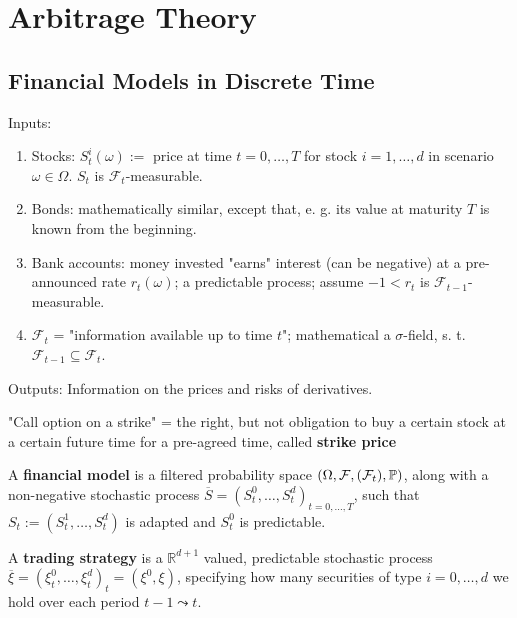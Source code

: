 \chapter{Arbitrage Theory}

\section{Financial Models in Discrete Time}

\begin{defi} 
Inputs:
\begin{enumerate}
    \item Stocks: $S_t^i(\omega) :=$ price at time $t=0, \ldots, T$ for stock $i=1, \ldots, d$ in scenario $\omega\in \Omega$. $S_t$ is $\mathcal F_t$-measurable.
    \item Bonds: mathematically similar, except that, e. g. its value at maturity $T$ is known from the beginning.
    \item Bank accounts: money invested "earns" interest (can be negative) at a pre-announced rate $r_t(\omega)$; a predictable process; assume $-1<r_t$ is $\mathcal F_{t-1}$-measurable.
    \item $\mathcal F_t$ = "information available up to time $t$"; mathematical a $\sigma$-field, s. t. $\mathcal F_{t-1}\subseteq \mathcal F_t$.
\end{enumerate}
\end{defi}

\begin{defi}
Outputs:
Information on the prices and risks of derivatives.
\end{defi}

\begin{ex}
"Call option on a strike" = the right, but not obligation to buy a certain stock at a certain future time for a pre-agreed time, called \textbf{strike price}
\end{ex}

\begin{defi}
A \textbf{financial model} is a filtered probability space $(\Omega, \mathcal F, (\mathcal F_t), \mathbb{P})$, along with a non-negative stochastic process $\overline S = (S_t^0, \ldots, S_t^d)_{t=0, \ldots, T}$, such that $S_t:= (S_t^1, \ldots, S_t^d)$  is adapted and $S_t^0$ is predictable.
\end{defi}

\begin{defi}
A \textbf{trading strategy} is a $\mathbb R^{d+1}$ valued, predictable stochastic process $\overline \xi = (\xi_t^0, \ldots, \xi_t^d)_t = (\xi^0, \xi)$, specifying how many securities of type $i=0,\ldots, d$ we hold over each period $t-1\leadsto t$.
\end{defi}

